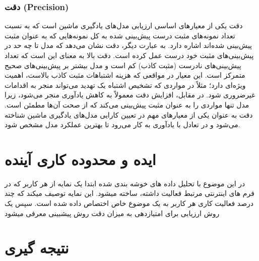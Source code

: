 \subsubsection*{دقت (Precision)}
دقت یکی از معیارهای اساسی ارزیابی مدل‌های یادگیری ماشین است که به نسبت تعداد نمونه‌های مثبت درست پیش‌بینی شده به کل نمونه‌هایی که به عنوان مثبت پیش‌بینی شده‌اند اشاره دارد. به عبارت دیگر، دقت نشان می‌دهد که مدل تا چه حد در پیش‌بینی‌های مثبت خود درست عمل کرده است. دقت بالا به معنای این است که تعداد پیش‌بینی‌های نادرست (مثبت کاذب) کم است و مدل بیشتر بر پیش‌بینی‌های صحیح متمرکز است. این معیار در مواقعی که هزینه اشتباهات مثبت کاذب بالاست، اهمیت ویژه‌ای دارد؛ مثلاً در مواردی که تشخیص اشتباه یک تهدید می‌تواند منجر به اقدامات غیرضروری شود. در مقابل، افزایش دقت معمولاً به کاهش یادآوری منجر می‌شود، زیرا مدل تنها مواردی را به عنوان مثبت پیش‌بینی می‌کند که از صحت آن‌ها مطمئن است. دقت به عنوان یکی از معیارهای مهم در تعیین کارایی مدل‌های یادگیری ماشین شناخته می‌شود و در تعادل با یادآوری به کار می‌رود تا بهترین عملکرد مدل مشخص شود.





\section*{ایده و محدوده کاری آینده}
در این موضوع با تحلیل داده های خوشه بندی شده ابتدا یک نمایه از هر کاربر که در فرم های اینترنتی مرتبط فعالیت داشته، ساخته میشود.
این نمایه توصیف میکند که چند درصد فعالیت کاری هر کاربر به یک موضوع خاص اختصاص داده شده است.
سپس یک روش ارزیابی برای امتیازدهی به میزان دقت روش پیشبینی معرفی میشود
\section*{نتیجه گیری}